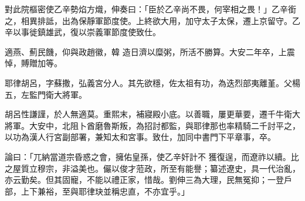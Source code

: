 \begin{pinyinscope}
 對此院樞密使乙辛勢焰方熾，伸奏曰：「臣於乙辛尚不畏，何宰相之畏！」乙辛銜之，相異排詆，出為保靜軍節度使。上終欲大用，加守太子太保，遷上京留守。乙辛以事徙鎮雄武，復以崇義軍節度使致仕。



 適燕、薊民饑，仰與政趙徽，韓
 造日濟以糜粥，所活不勝算。大安二年卒，上震悼，賻贈加等。



 耶律胡呂，字蘇撒，弘義宮分人。其先欲穩，佐太祖有功，為迭烈部夷離堇。父楊五，左監門衛大將軍。



 胡呂性謙謹，於人無適莫。重熙末，補寢殿小底。以善職，屢更華要，遷千牛衛大將軍。大安中，北阻卜酋磨魯斯叛，為招討都監，與耶律那也率精騎二千討平之，以功為漢人行宮副部署，兼知太和宮事。致仕，加同中書門下平章事，卒。



 論曰：「兀納當道宗昏惑之會，擁佑皇孫，使乙辛奸計不
 獲復逞，而遼祚以續。比之屋質立穆宗，非溢美也。儼以俊才蒞政，所至有能譽；纂述遼史，具一代治亂，亦云勤矣。但其固寵，不能以禮正家，惜哉。劉伸三為大理，民無冤抑；一登戶部，上下兼裕，至與耶律玦並稱忠直，不亦宜乎。」



\end{pinyinscope}